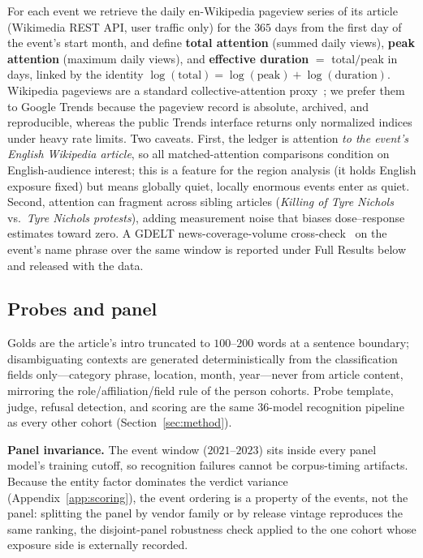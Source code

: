 For each event we retrieve the daily en-Wikipedia pageview series of its article (Wikimedia REST API, user traffic only) for the $365$ days from the first day of the event's start month, and define \textbf{total attention} (summed daily views), \textbf{peak attention} (maximum daily views), and \textbf{effective duration} $=$ total$/$peak in days, linked by the identity $\log(\text{total}) = \log(\text{peak}) + \log(\text{duration})$. Wikipedia pageviews are a standard collective-attention proxy~\citep{mestyan2013early,ripberger2011capturing}; we prefer them to Google Trends because the pageview record is absolute, archived, and reproducible, whereas the public Trends interface returns only normalized indices under heavy rate limits. Two caveats. First, the ledger is attention \emph{to the event's English Wikipedia article}, so all matched-attention comparisons condition on English-audience interest; this is a feature for the region analysis (it holds English exposure fixed) but means globally quiet, locally enormous events enter as quiet. Second, attention can fragment across sibling articles (\emph{Killing of Tyre Nichols} vs.\ \emph{Tyre Nichols protests}), adding measurement noise that biases dose--response estimates toward zero. A GDELT news-coverage-volume cross-check~\citep{leetaru2013gdelt} on the event's name phrase over the same window is reported under Full Results below and released with the data.

\subsection{Probes and panel}

Golds are the article's intro truncated to $100$--$200$ words at a sentence boundary; disambiguating contexts are generated deterministically from the classification fields only---category phrase, location, month, year---never from article content, mirroring the role/affiliation/field rule of the person cohorts. Probe template, judge, refusal detection, and scoring are the same $36$-model recognition pipeline as every other cohort (Section~\ref{sec:method}).

\textbf{Panel invariance.} The event window ($2021$--$2023$) sits inside every panel model's training cutoff, so recognition failures cannot be corpus-timing artifacts. Because the entity factor dominates the verdict variance (Appendix~\ref{app:scoring}), the event ordering is a property of the events, not the panel: splitting the panel by vendor family or by release vintage reproduces the same ranking, the disjoint-panel robustness check applied to the one cohort whose exposure side is externally recorded.

